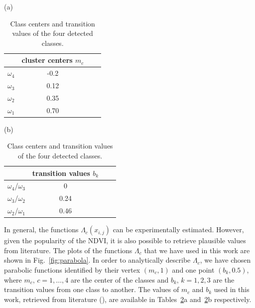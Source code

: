 \documentclass[letterpaper, 10pt, conference]{ieeeconf}      %
\begin{document}
\begin{table}[t]
		\centering
	(a) \begin{subtable}[t]{0.20\textwidth}
		\centering
		\begin{tabular}{ | c| c | c | p{5cm} |} 
    		\hline
    		\; & cluster centers $m_c$  \\ \hline
    		$\omega_4$ & -0.2 \\  \hline
    		$\omega_3$ &  0.12  \\ \hline
    		$\omega_2$ &  0.35  \\ \hline
    		$\omega_1$ &   0.70\\
   		\hline
    \end{tabular}\vspace{-1mm}
    \label{table_cluster}
    \end{subtable}
%
 	(b) \begin{subtable}[t]{0.23\textwidth}
\centering
    		\vspace{-8mm}
   		\begin{tabular}{ | c| c | c | p{5cm} |} 
    		\hline
     		& transition values $b_k$\\ \hline
    		$\omega_4$/$\omega_3$ & 0  \\  \hline
    		$\omega_3$/$\omega_2$ &  0.24 \\ \hline
    		$\omega_2$/$\omega_1$ &  0.46  \\ \hline
    		\end{tabular}
    		\vspace{-1mm}
		\label{table_transition}
	\end{subtable}\vspace{-0mm}
			\caption{Class centers and transition values of the four detected classes.}\label{table_all}
			\vspace{-5mm}
\end{table}




In general, the functions $\Lambda_c(x_{i,j})$ can be experimentally estimated.
However, given the popularity of the NDVI, it is also possible to retrieve plausible values from literature.
The plots of the functions $\Lambda_c$ that we have used in this work are shown in Fig.~\ref{fig:parabola}.
In order to analytically describe $\Lambda_c$, we have chosen parabolic functions identified by their vertex $(m_c,1)$ and one point $(b_k,0.5)$, where $m_c, \, c=1,\ldots,4$ are the center of the classes and $b_k, \, k=1,2,3$ are the transition values from one class to another.
The values of $m_c$ and $b_k$ used in this work, retrieved from literature (\cite{2008_PocPar,2009_BaHoGrRi}), are available in Tables~\ref{table_all}a and~\ref{table_all}b respectively.
\end{document}
